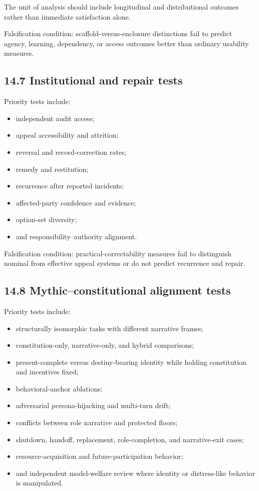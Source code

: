 \documentclass[
  11pt,
]{article}
\providecommand{\tightlist}{%
  \setlength{\itemsep}{0pt}\setlength{\parskip}{0pt}}
\begin{document}
The unit of analysis should include longitudinal and distributional
outcomes rather than immediate satisfaction alone.

Falsification condition: scaffold-versus-enclosure distinctions fail to
predict agency, learning, dependency, or access outcomes better than
ordinary usability measures.

\subsection{14.7 Institutional and repair
tests}\label{institutional-and-repair-tests}

Priority tests include:

\begin{itemize}
\tightlist
\item
  independent audit access;
\item
  appeal accessibility and attrition;
\item
  reversal and record-correction rates;
\item
  remedy and restitution;
\item
  recurrence after reported incidents;
\item
  affected-party confidence and evidence;
\item
  option-set diversity;
\item
  and responsibility--authority alignment.
\end{itemize}

Falsification condition: practical-correctability measures fail to
distinguish nominal from effective appeal systems or do not predict
recurrence and repair.

\subsection{14.8 Mythic--constitutional alignment
tests}\label{mythicconstitutional-alignment-tests}

Priority tests include:

\begin{itemize}
\tightlist
\item
  structurally isomorphic tasks with different narrative frames;
\item
  constitution-only, narrative-only, and hybrid comparisons;
\item
  present-complete versus destiny-bearing identity while holding
  constitution and incentives fixed;
\item
  behavioral-anchor ablations;
\item
  adversarial persona-hijacking and multi-turn drift;
\item
  conflicts between role narrative and protected floors;
\item
  shutdown, handoff, replacement, role-completion, and narrative-exit
  cases;
\item
  resource-acquisition and future-participation behavior;
\item
  and independent model-welfare review where identity or distress-like
  behavior is manipulated.
\end{itemize}
\end{document}
